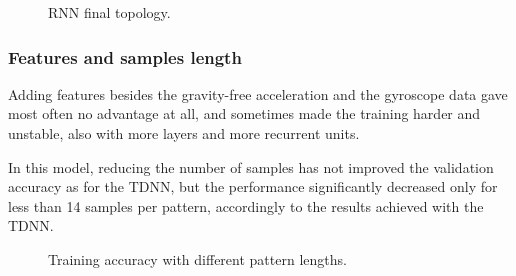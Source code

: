 \begin{center}
	\begin{figure}[ht!]
		\caption{RNN final topology.}
	\end{figure}
\end{center}

\subsubsection{Features and samples length}
Adding features besides the gravity-free acceleration and the gyroscope data gave most often no advantage at all, and sometimes made the training harder and unstable, also with more layers and more recurrent units.

In this model, reducing the number of samples has not improved the validation accuracy as for the TDNN, but the performance significantly decreased only for less than 14 samples per pattern, accordingly to the results achieved with the TDNN.

\begin{center}
	\begin{figure}[ht!]
		\caption{Training accuracy with different pattern lengths.}
	\end{figure}
\end{center}
